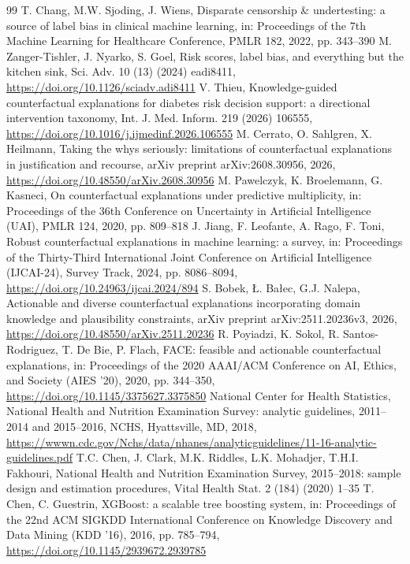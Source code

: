 \documentclass[preprint,review,12pt,times]{elsarticle}
\begin{document}
\begin{thebibliography}{99}
 T. Chang, M.W. Sjoding, J. Wiens, Disparate censorship \& undertesting: a source of label bias in clinical machine learning, in: Proceedings of the 7th Machine Learning for Healthcare Conference, PMLR 182, 2022, pp. 343–390
 M. Zanger-Tishler, J. Nyarko, S. Goel, Risk scores, label bias, and everything but the kitchen sink, Sci. Adv. 10 (13) (2024) eadi8411, \url{https://doi.org/10.1126/sciadv.adi8411}
 V. Thieu, Knowledge-guided counterfactual explanations for diabetes risk decision support: a directional intervention taxonomy, Int. J. Med. Inform. 219 (2026) 106555, \url{https://doi.org/10.1016/j.ijmedinf.2026.106555}
 M. Cerrato, O. Sahlgren, X. Heilmann, Taking the whys seriously: limitations of counterfactual explanations in justification and recourse, arXiv preprint arXiv:2608.30956, 2026, \url{https://doi.org/10.48550/arXiv.2608.30956}
 M. Pawelczyk, K. Broelemann, G. Kasneci, On counterfactual explanations under predictive multiplicity, in: Proceedings of the 36th Conference on Uncertainty in Artificial Intelligence (UAI), PMLR 124, 2020, pp. 809–818
 J. Jiang, F. Leofante, A. Rago, F. Toni, Robust counterfactual explanations in machine learning: a survey, in: Proceedings of the Thirty-Third International Joint Conference on Artificial Intelligence (IJCAI-24), Survey Track, 2024, pp. 8086–8094, \url{https://doi.org/10.24963/ijcai.2024/894}
 S. Bobek, Ł. Bałec, G.J. Nalepa, Actionable and diverse counterfactual explanations incorporating domain knowledge and plausibility constraints, arXiv preprint arXiv:2511.20236v3, 2026, \url{https://doi.org/10.48550/arXiv.2511.20236}
 R. Poyiadzi, K. Sokol, R. Santos-Rodriguez, T. De Bie, P. Flach, FACE: feasible and actionable counterfactual explanations, in: Proceedings of the 2020 AAAI/\allowbreak{}ACM Conference on AI, Ethics, and Society (AIES '20), 2020, pp. 344–350, \url{https://doi.org/10.1145/3375627.3375850}
 National Center for Health Statistics, National Health and Nutrition Examination Survey: analytic guidelines, 2011–2014 and 2015–2016, NCHS, Hyattsville, MD, 2018, \url{https://wwwn.cdc.gov/Nchs/data/nhanes/analyticguidelines/11-16-analytic-guidelines.pdf}
 T.C. Chen, J. Clark, M.K. Riddles, L.K. Mohadjer, T.H.I. Fakhouri, National Health and Nutrition Examination Survey, 2015–2018: sample design and estimation procedures, Vital Health Stat. 2 (184) (2020) 1–35
 T. Chen, C. Guestrin, XGBoost: a scalable tree boosting system, in: Proceedings of the 22nd ACM SIGKDD International Conference on Knowledge Discovery and Data Mining (KDD '16), 2016, pp. 785–794, \url{https://doi.org/10.1145/2939672.2939785}

\end{thebibliography}
\end{document}
